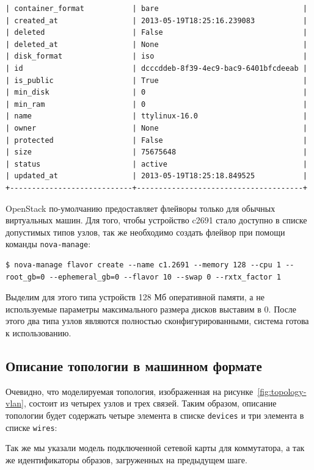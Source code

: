 \begin{lstlisting}
| container_format           | bare                                 |
| created_at                 | 2013-05-19T18:25:16.239083           |
| deleted                    | False                                |
| deleted_at                 | None                                 |
| disk_format                | iso                                  |
| id                         | dcccddeb-8f39-4ec9-bac9-6401bfcdeeab |
| is_public                  | True                                 |
| min_disk                   | 0                                    |
| min_ram                    | 0                                    |
| name                       | ttylinux-16.0                        |
| owner                      | None                                 |
| protected                  | False                                |
| size                       | 75675648                             |
| status                     | active                               |
| updated_at                 | 2013-05-19T18:25:18.849525           |
+----------------------------+--------------------------------------+
\end{lstlisting}

OpenStack по-умолчанию предоставляет флейворы только для обычных виртуальных машин.
Для того, чтобы устройство c2691 стало доступно в списке допустимых типов узлов, 
так же необходимо создать флейвор при помощи команды \verb`nova-manage`:
\begin{lstlisting}
$ nova-manage flavor create --name c1.2691 --memory 128 --cpu 1 --root_gb=0 --ephemeral_gb=0 --flavor 10 --swap 0 --rxtx_factor 1
\end{lstlisting}
Выделим для этого типа устройств 128 Мб оперативной памяти, а не используемые 
параметры максимального размера дисков выставим в 0. После этого два типа узлов 
являются полностью сконфигурированными, система готова к использованию.

\subsection{Описание топологии в машинном формате}

Очевидно, что моделируемая топология, изображенная на рисунке~\ref{fig:topology-vlan}, состоит из четырех
узлов и трех связей. Таким образом, описание топологии будет содержать четыре элемента в списке \verb`devices` 
и три элемента в списке \verb`wires`:

Так же мы указали модель подключенной сетевой карты для коммутатора, а так же идентификаторы образов,
загруженных на предыдущем шаге.

